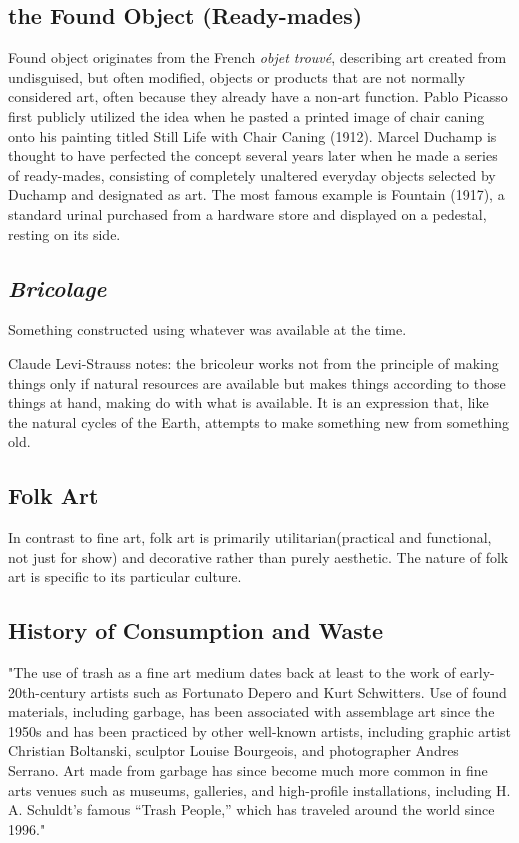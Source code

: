 \documentclass[12pt]{article}
\begin{document}
\subsection{the Found Object (Ready-mades)}
Found object originates from the French \textit{objet trouvé}, describing art created from undisguised, but often modified, objects or products that are not normally considered art, often because they already have a non-art function. Pablo Picasso first publicly utilized the idea when he pasted a printed image of chair caning onto his painting titled Still Life with Chair Caning (1912). Marcel Duchamp is thought to have perfected the concept several years later when he made a series of ready-mades, consisting of completely unaltered everyday objects selected by Duchamp and designated as art. The most famous example is Fountain (1917), a standard urinal purchased from a hardware store and displayed on a pedestal, resting on its side.

\subsection{\textit{Bricolage}}
Something constructed using whatever was available at the time.

Claude Levi-Strauss notes: the bricoleur works not from the principle of making things only if natural resources are available but makes things according to those things at hand, making do with what is available. It is an expression that, like the natural cycles of the Earth, attempts to make something new from something old. \cite{levi1966savage}

\subsection{Folk Art}
In contrast to fine art, folk art is primarily utilitarian(practical and functional, not just for show) and decorative rather than purely aesthetic. The nature of folk art is specific to its particular culture.

\subsection{History of Consumption and Waste}
"The use of trash as a fine art medium dates back at least to the work of early-20th-century artists such as Fortunato Depero and Kurt Schwitters. Use of found materials, including garbage, has been associated with assemblage art since the 1950s and has been practiced by other well-known artists, including graphic artist Christian Boltanski, sculptor Louise Bourgeois, and photographer Andres Serrano. Art made from garbage has since become much more common in fine arts venues such as museums, galleries, and high-profile installations, including H. A. Schuldt’s famous “Trash People,” which has traveled around the world since 1996." \cite{tauxe2012encyclopedia}
\end{document}
